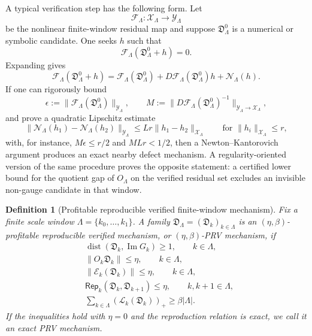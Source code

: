 \documentclass[11pt]{article}
\numberwithin{equation}{section}
\newtheorem{definition}[theorem]{Definition}
\newcommand{\pos}[1]{\left(#1\right)_+}
\newcommand{\N}{\mathcal N}
\newcommand{\calY}{\mathcal Y}
\newcommand{\calX}{\mathcal X}
\newcommand{\calE}{\mathcal E}
\newcommand{\calF}{\mathcal F}
\newcommand{\calL}{\mathcal L}
\newcommand{\Rep}{\mathsf{Rep}}
\newcommand{\Image}{\operatorname{Im}}
\newcommand{\Dist}{\operatorname{dist}}
\begin{document}
A typical verification step has the following form.  Let
\[
    \calF_\Lambda:\calX_\Lambda\to\calY_\Lambda
\]
be the nonlinear finite-window residual map and suppose $\mathfrak D_\Lambda^0$ is a numerical or symbolic candidate.  One seeks $h$ such that
\[
    \calF_\Lambda(\mathfrak D_\Lambda^0+h)=0.
\]
Expanding gives
\[
    \calF_\Lambda(\mathfrak D_\Lambda^0+h)
    =
    \calF_\Lambda(\mathfrak D_\Lambda^0)
    +D\calF_\Lambda(\mathfrak D_\Lambda^0)h
    +\N_\Lambda(h).
\]
If one can rigorously bound
\begin{equation}\label{eq:newton-bounds}
    \epsilon:=\|\calF_\Lambda(\mathfrak D_\Lambda^0)\|_{\calY_\Lambda},
    \qquad
    M:=\|D\calF_\Lambda(\mathfrak D_\Lambda^0)^{-1}\|_{\calY_\Lambda\to\calX_\Lambda},
\end{equation}
and prove a quadratic Lipschitz estimate
\begin{equation}\label{eq:newton-nonlinear-bound}
    \|\N_\Lambda(h_1)-\N_\Lambda(h_2)\|_{\calY_\Lambda}
    \leq
    Lr\|h_1-h_2\|_{\calX_\Lambda}
    \qquad \text{for }\|h_i\|_{\calX_\Lambda}\le r,
\end{equation}
with, for instance, $M\epsilon\le r/2$ and $MLr<1/2$, then a Newton--Kantorovich argument produces an exact nearby defect mechanism.  A regularity-oriented version of the same procedure proves the opposite statement: a certified lower bound for the quotient gap of $O_\Lambda$ on the verified residual set excludes an invisible non-gauge candidate in that window.

\begin{definition}[Profitable reproducible verified finite-window mechanism]\label{def:prv-mechanism}
Fix a finite scale window $\Lambda=\{k_0,\ldots,k_1\}$.  A family $\mathfrak D_\Lambda=(\mathfrak D_k)_{k\in\Lambda}$ is an $(\eta,\beta)$-profitable reproducible verified mechanism, or $(\eta,\beta)$-PRV mechanism, if
\begin{align}
    &\Dist(\mathfrak D_k,\Image G_k)\ge 1,
    \qquad k\in\Lambda,\label{eq:prv-nongauge}\\
    &\|O_k\mathfrak D_k\|\le \eta,
    \qquad k\in\Lambda,\label{eq:prv-invisible}\\
    &\|\calE_k(\mathfrak D_k)\|\le \eta,
    \qquad k\in\Lambda,\label{eq:prv-residual}\\
    &\Rep_k(\mathfrak D_k,\mathfrak D_{k+1})\le \eta,
    \qquad k,k+1\in\Lambda,\label{eq:prv-reproduction}\\
    &\sum_{k\in\Lambda}\pos{\calL_k(\mathfrak D_k)}
    \ge \beta |\Lambda|.\label{eq:prv-profit}
\end{align}
If the inequalities hold with $\eta=0$ and the reproduction relation is exact, we call it an exact PRV mechanism.
\end{definition}
\end{document}
